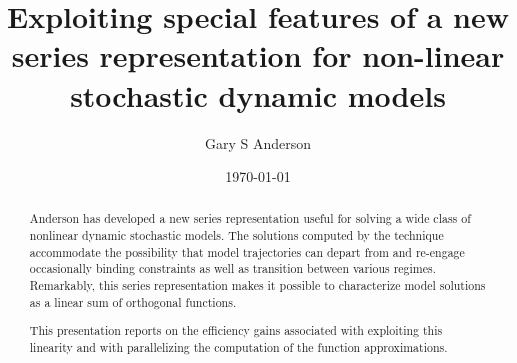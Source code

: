 \documentclass[14pt]{article}
\title{Exploiting special features of a new series representation for non-linear stochastic dynamic models}
\author{Gary S Anderson}
\date{\today}
\begin{document}
\maketitle
\begin{abstract}
Anderson has developed a new series representation useful for
solving a wide class of nonlinear dynamic stochastic models.
The solutions computed by the technique accommodate the possibility that 
model trajectories can depart from and re-engage
occasionally binding constraints as well as transition between various regimes. Remarkably, this series representation makes it possible to characterize model solutions as a linear sum of orthogonal functions.  

This presentation reports on the efficiency gains associated with exploiting this linearity and with parallelizing the
computation of the function approximations.


\end{abstract}
\end{document}
